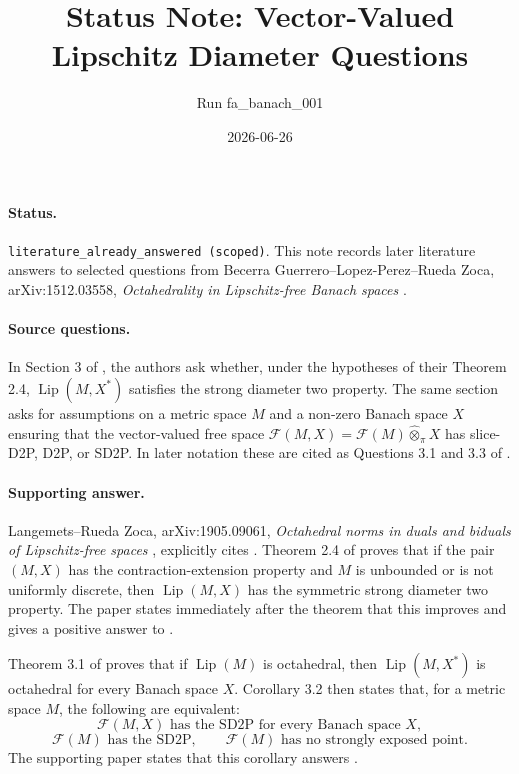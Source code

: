 \documentclass[11pt]{article}
\title{Status Note: Vector-Valued Lipschitz Diameter Questions}
\author{Run fa\_banach\_001}
\date{2026-06-26}
\newcommand{\Lip}{\operatorname{Lip}}
\newcommand{\Free}{\mathcal F}
\newcommand{\pten}{\widehat{\otimes}_{\pi}}
\begin{document}
\maketitle

\paragraph{Status.}
\texttt{literature\_already\_answered (scoped)}.  This note records later
literature answers to selected questions from
Becerra Guerrero--Lopez-Perez--Rueda Zoca, arXiv:1512.03558,
\emph{Octahedrality in Lipschitz-free Banach spaces} \cite{BGLRZ1512}.

\paragraph{Source questions.}
In Section 3 of \cite{BGLRZ1512}, the authors ask whether, under the
hypotheses of their Theorem 2.4, $\Lip(M,X^*)$ satisfies the strong diameter
two property.  The same section asks for assumptions on a metric space $M$ and
a non-zero Banach space $X$ ensuring that the vector-valued free space
$\Free(M,X)=\Free(M)\pten X$ has slice-D2P, D2P, or SD2P.  In later notation
these are cited as Questions 3.1 and 3.3 of \cite{BGLRZ1512}.

\paragraph{Supporting answer.}
Langemets--Rueda Zoca, arXiv:1905.09061, \emph{Octahedral norms in duals and
biduals of Lipschitz-free spaces} \cite{LRZ1905}, explicitly cites
\cite{BGLRZ1512}.  Theorem 2.4 of \cite{LRZ1905} proves that if the pair
$(M,X)$ has the contraction-extension property and $M$ is unbounded or is not
uniformly discrete, then $\Lip(M,X)$ has the symmetric strong diameter two
property.  The paper states immediately after the theorem that this improves
\cite[Theorem 2.4]{BGLRZ1512} and gives a positive answer to
\cite[Question 3.1]{BGLRZ1512}.

Theorem 3.1 of \cite{LRZ1905} proves that if $\Lip(M)$ is octahedral, then
$\Lip(M,X^*)$ is octahedral for every Banach space $X$.  Corollary 3.2 then
states that, for a metric space $M$, the following are equivalent:
\[
  \Free(M,X)\text{ has the SD2P for every Banach space }X,
\]
\[
  \Free(M)\text{ has the SD2P},
  \qquad
  \Free(M)\text{ has no strongly exposed point}.
\]
The supporting paper states that this corollary answers
\cite[Question 3.3]{BGLRZ1512}.
\end{document}
